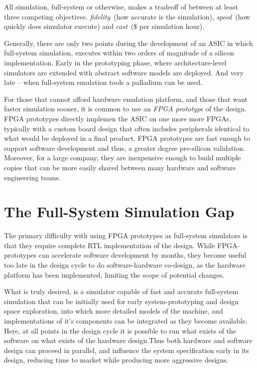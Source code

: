All simulation, full-system or otherwise, makes a tradeoff of between at least
three competing objectives.  \emph{fidelity}~(how accurate is the simulation),
\emph{speed}~(how quickly does simulator execute) and \emph{cost}~(\$ per
simulation hour). 

Generally, there are only two points during the development of an ASIC in which
full-system simulation, executes within two orders of magnitude of a silicon
implementation. Early in the prototyping phase, where architecture-level
simulators are extended with abstract software models are deployed. And very
late -- when full-system emulation tools a palladium can be used.

For those that cannot afford hardware emulation platform, and those
that want faster simulation sooner, it is common to use an \emph{FPGA
prototype} of the design. FPGA prototypes directly implemen the ASIC on
one more more FPGAs, typically with a custom board design that often includes
peripherals identical to what would be deployed in a final product. FPGA
prototypes are fast enough to support software development and thus, a greater
degree pre-silicon validation. Moreover, for a large company, they are
inexpensive enough to build multiple copies that can be more easily shared
between many hardware and software engineering teams.

\section{The Full-System Simulation Gap}

The primary difficulty with using FPGA prototypes as full-system simulators is
that they require complete RTL implementation of the design. While
FPGA-prototypes can accelerate software development by months, they become
useful too late in the design cycle to do software-hardware co-design, as the
hardware platform has been implemented, limiting the scope of potential
changes.

What is truly desired, is a simulator capable of fast and accurate full-system
simulation that can be initially used for early system-prototyping and design
space exploration, into which more detailed models of the machine, and
implementations of it's components can be integrated as they become available.
Here, at all points in the design cycle it is possible to run what exists of
the software on what exists of the hardware design.Thus both hardware and
software design can proceed in parallel, and influence the system specification
early in its design, reducing time to market while producing more aggressive
designs.

